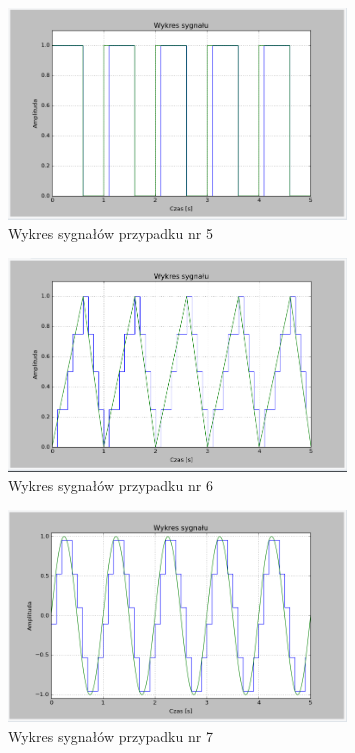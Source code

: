 \documentclass{article}
\begin{document}
    \begin{figure}[h!]
        \centering
        \includegraphics[width=0.8\textwidth]{img/1/quad_rect_2.png}
        \caption{Wykres sygnałów przypadku nr 5}
    \end{figure}
    \FloatBarrier

    \begin{figure}[h!]
        \centering
        \includegraphics[width=0.8\textwidth]{img/1/quad_tri_5.png}
        \caption{Wykres sygnałów przypadku nr 6}
    \end{figure}
    \FloatBarrier

    \begin{figure}[h!]
        \centering
        \includegraphics[width=0.8\textwidth]{img/1/quad_sin_10.png}
        \caption{Wykres sygnałów przypadku nr 7}
    \end{figure}
    \FloatBarrier
\end{document}
